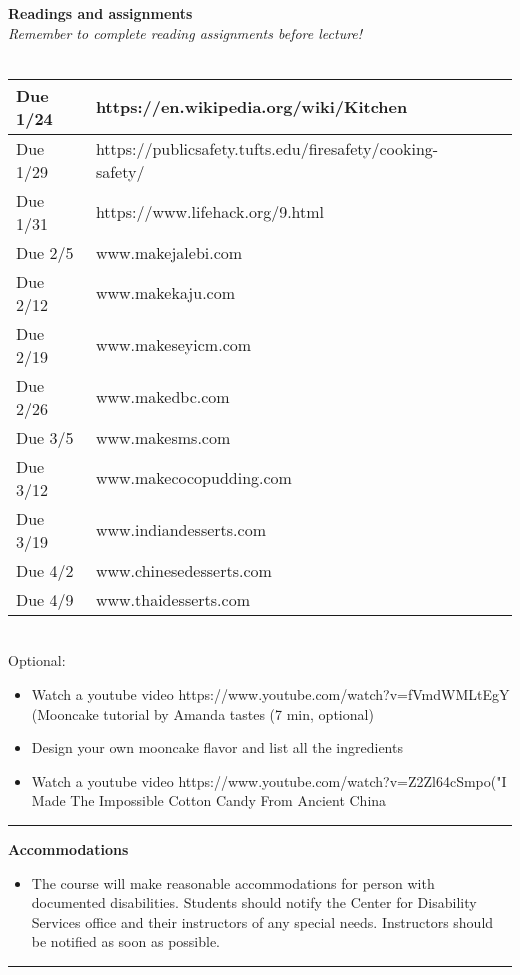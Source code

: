\documentclass{article}
\begin{document}
\noindent\textbf{Readings and assignments} \\
\textit{\small Remember to complete reading assignments before lecture!} \\ \\
\vspace{0.5em} \begin{tabular}{|l|l|l|l|}
\hline 
Due 1/24 & https://en.wikipedia.org/wiki/Kitchen \\
\hline
Due 1/29 & https://publicsafety.tufts.edu/firesafety/cooking-safety/\\
\hline
Due 1/31 & https://www.lifehack.org/9.html \\
\hline
Due 2/5 & www.makejalebi.com \\
\hline
Due 2/12 & www.makekaju.com\\
\hline
Due 2/19 & www.makeseyicm.com\\
\hline 
Due 2/26 & www.makedbc.com\\
\hline 
Due 3/5 & www.makesms.com\\
\hline 
Due 3/12 & www.makecocopudding.com\\
\hline 
Due 3/19 & www.indiandesserts.com \\
\hline
Due 4/2 & www.chinesedesserts.com \\
\hline
Due 4/9 & www.thaidesserts.com \\
\hline
\end{tabular}\\
Optional:
\begin{itemize}
\item Watch a youtube video https://www.youtube.com/watch?v=fVmdWMLtEgY (Mooncake tutorial by Amanda tastes (7 min, optional)
\item Design your own mooncake flavor and list all the ingredients 
\item Watch a youtube video https://www.youtube.com/watch?v=Z2Zl64cSmpo("I Made The Impossible Cotton Candy From Ancient China 
\end{itemize}
  \par\noindent\rule{\textwidth}{0.4pt}
\textbf{Accommodations }
\begin{itemize}
\vspace{0.5em} 
\item\noindent The course will make reasonable accommodations for person with documented disabilities. Students should notify the Center for Disability Services office and their instructors of any special needs. Instructors should be notified as soon as possible.

 \end{itemize}
  \par\noindent\rule{\textwidth}{0.4pt}
\end{document}
